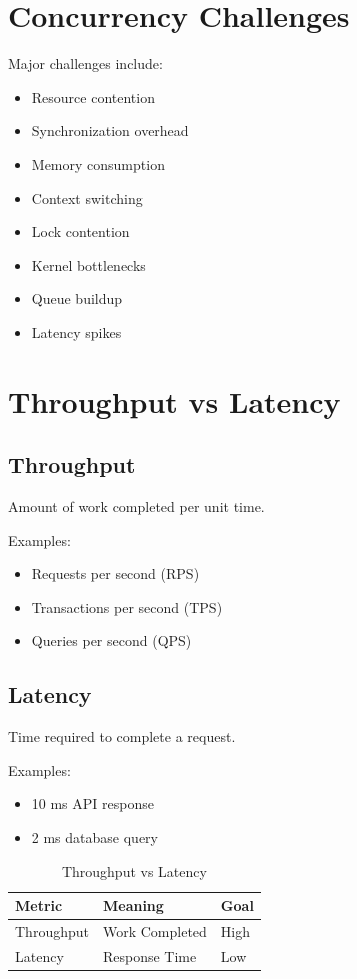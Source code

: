 \section{Concurrency Challenges}

Major challenges include:

\begin{itemize}
\item Resource contention
\item Synchronization overhead
\item Memory consumption
\item Context switching
\item Lock contention
\item Kernel bottlenecks
\item Queue buildup
\item Latency spikes
\end{itemize}

\section{Throughput vs Latency}

\subsection{Throughput}

Amount of work completed per unit time.

Examples:

\begin{itemize}
\item Requests per second (RPS)
\item Transactions per second (TPS)
\item Queries per second (QPS)
\end{itemize}

\subsection{Latency}

Time required to complete a request.

Examples:

\begin{itemize}
\item 10 ms API response
\item 2 ms database query
\end{itemize}

\begin{table}[H]
\centering
\begin{tabular}{lll}
\toprule
Metric & Meaning & Goal \\
\midrule
Throughput & Work Completed & High \\
Latency & Response Time & Low \\
\bottomrule
\end{tabular}
\caption{Throughput vs Latency}
\end{table}

